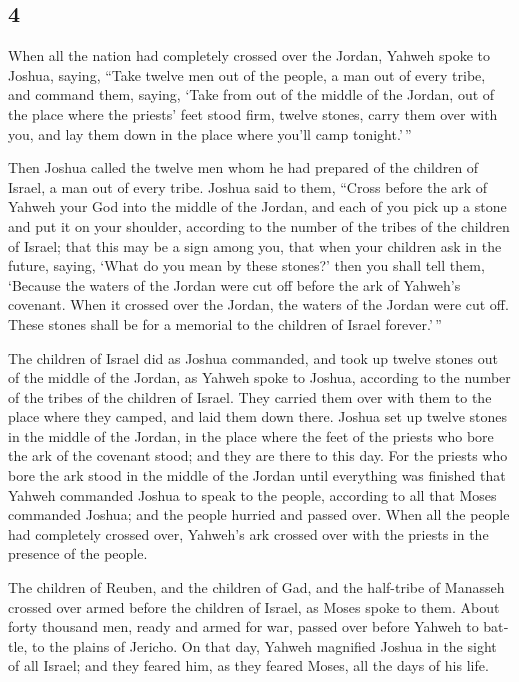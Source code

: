 \begin{paracol}{2}
\switchcolumn
\begin{otherlanguage}{english}

\hypertarget{section-7}{%
\section{4}\label{section-7}}

 When all the nation had completely crossed over the
Jordan, Yahweh spoke to Joshua, saying,  ``Take twelve men
out of the people, a man out of every tribe,  and command
them, saying, `Take from out of the middle of the Jordan, out of the
place where the priests' feet stood firm, twelve stones, carry them over
with you, and lay them down in the place where you'll camp tonight.'\,''

 Then Joshua called the twelve men whom he had prepared of
the children of Israel, a man out of every tribe.  Joshua
said to them, ``Cross before the ark of Yahweh your God into the middle
of the Jordan, and each of you pick up a stone and put it on your
shoulder, according to the number of the tribes of the children of
Israel;  that this may be a sign among you, that when your
children ask in the future, saying, `What do you mean by these stones?'
 then you shall tell them, `Because the waters of the
Jordan were cut off before the ark of Yahweh's covenant. When it crossed
over the Jordan, the waters of the Jordan were cut off. These stones
shall be for a memorial to the children of Israel forever.'\,''

 The children of Israel did as Joshua commanded, and took
up twelve stones out of the middle of the Jordan, as Yahweh spoke to
Joshua, according to the number of the tribes of the children of Israel.
They carried them over with them to the place where they camped, and
laid them down there.  Joshua set up twelve stones in the
middle of the Jordan, in the place where the feet of the priests who
bore the ark of the covenant stood; and they are there to this day.
 For the priests who bore the ark stood in the middle of
the Jordan until everything was finished that Yahweh commanded Joshua to
speak to the people, according to all that Moses commanded Joshua; and
the people hurried and passed over.  When all the people
had completely crossed over, Yahweh's ark crossed over with the priests
in the presence of the people.

 The children of Reuben, and the children of Gad, and the
half-tribe of Manasseh crossed over armed before the children of Israel,
as Moses spoke to them.  About forty thousand men, ready
and armed for war, passed over before Yahweh to battle, to the plains of
Jericho.  On that day, Yahweh magnified Joshua in the
sight of all Israel; and they feared him, as they feared Moses, all the
days of his life.


\end{otherlanguage}
\end{paracol}
